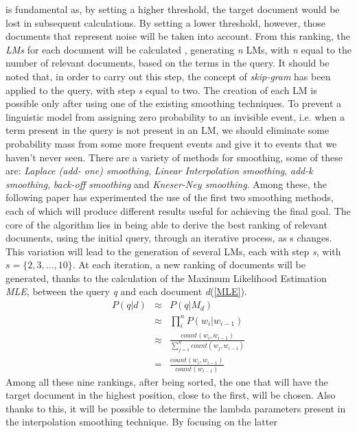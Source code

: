 is fundamental as, by setting a higher threshold, the target document would 
be lost in subsequent calculations. By setting a lower threshold, however, 
those documents that represent noise will be taken into account. From this 
ranking, the \emph{LMs} for each document will be calculated \cite{10}, generating \emph{n} LMs, 
with \emph{n} equal to the number of relevant documents, based on the terms in the 
query. It should be noted that, in order to carry out this step, the concept 
of \emph{skip-gram} has been applied to the query, with step \emph{s} equal to two. The 
creation of each LM is possible only after using one of the existing smoothing 
techniques. To prevent a linguistic model from assigning zero probability to 
an invisible event, i.e. when a term present in the query is not present in 
an LM, we should eliminate some probability mass from some more frequent 
events and give it to events that we haven't never seen. There 
are a variety of methods for smoothing, some of these are: \emph{Laplace (add-
one) smoothing}, \emph{Linear Interpolation smoothing}, \emph{add-k smoothing}, \emph{back-off 
smoothing} and \emph{Kneser-Ney smoothing}. Among these, the following paper 
has experimented the use of the first two smoothing methods, each of which 
will produce different results useful for achieving the final goal. The core of 
the algorithm lies in being able to derive the best ranking of relevant documents, 
using the initial query, through an iterative process, as s changes. 
This variation will lead to the generation of several LMs, each with step \emph{s}, 
with $s=\{2,3,\ldots,10\}$. At each iteration, a new ranking of documents will be generated, thanks to the calculation of the Maximum Likelihood Estimation \emph{MLE}, between the query \emph{q} and each document \emph{d}(\ref{MLE}).
\begin{eqnarray}\label{MLE}
    P(q|d) & \approx & P(q|M_d) \nonumber \\
           & \approx & \prod_i^n{P(w_i|w_{i-1})} \nonumber \\
           & \approx & \frac{count(w_i,w_{i-1})}{\sum_{j=1}^n count(w_j,w_{i-1})} \nonumber \\
           & = & \frac{count(w_i, w_{i-1})}{count(w_{i-1})}
\end{eqnarray}
Among all these nine rankings, after being sorted, the one that will have the 
target document in the highest position, close to the first, will be chosen. 
Also thanks to this, it will be possible to determine the lambda parameters 
present in the interpolation smoothing technique. By focusing on the latter 
